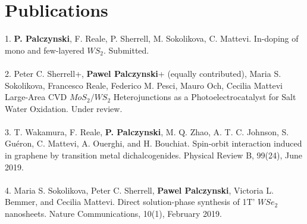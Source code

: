 \section*{Publications}
1. \textbf{P. Palczynski}, F. Reale, P. Sherrell, M. Sokolikova, C. Mattevi. In-doping of mono and few-layered $WS_2$. Submitted. \\ \\
2. Peter C. Sherrell+, \textbf{Pawel Palczynski}+ (equally contributed), Maria S. Sokolikova, Francesco Reale, Federico M. Pesci, Mauro Och, Cecilia Mattevi Large-Area CVD $MoS_2/WS_2$ Heterojunctions as a Photoelectrocatalyst for Salt Water Oxidation. Under review.\\ \\
3. T. Wakamura, F. Reale, \textbf{P. Palczynski}, M. Q. Zhao, A. T. C. Johnson, S. Gu\'{e}ron, C. Mattevi, A. Ouerghi, and H. Bouchiat. Spin-orbit interaction induced in graphene by transition metal dichalcogenides. Physical Review B, 99(24), June 2019.\\ \\
4. Maria S. Sokolikova, Peter C. Sherrell, \textbf{Pawel Palczynski}, Victoria L. Bemmer, and Cecilia Mattevi. Direct solution-phase synthesis of 1T' $WSe_2$ nanosheets. Nature Communications, 10(1), February 2019.\\ \\
